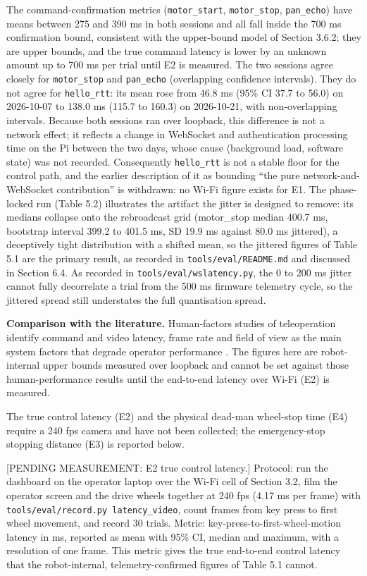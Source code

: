 The command-confirmation metrics (\texttt{motor\_start}, \texttt{motor\_stop}, \texttt{pan\_echo}) have means between 275 and 390 ms in both sessions and all fall inside the 700 ms confirmation bound, consistent with the upper-bound model of Section 3.6.2; they are upper bounds, and the true command latency is lower by an unknown amount up to 700 ms per trial until E2 is measured. The two sessions agree closely for \texttt{motor\_stop} and \texttt{pan\_echo} (overlapping confidence intervals). They do not agree for \texttt{hello\_rtt}: its mean rose from 46.8 ms (95\% CI 37.7 to 56.0) on 2026-10-07 to 138.0 ms (115.7 to 160.3) on 2026-10-21, with non-overlapping intervals. Because both sessions ran over loopback, this difference is not a network effect; it reflects a change in WebSocket and authentication processing time on the Pi between the two days, whose cause (background load, software state) was not recorded. Consequently \texttt{hello\_rtt} is not a stable floor for the control path, and the earlier description of it as bounding ``the pure network-and-WebSocket contribution'' is withdrawn: no Wi-Fi figure exists for E1. The phase-locked run (Table 5.2) illustrates the artifact the jitter is designed to remove: its medians collapse onto the rebroadcast grid (motor\_stop median 400.7 ms, bootstrap interval 399.2 to 401.5 ms, SD 19.9 ms against 80.0 ms jittered), a deceptively tight distribution with a shifted mean, so the jittered figures of Table 5.1 are the primary result, as recorded in \texttt{tools/eval/README.md} and discussed in Section 6.4. As recorded in \texttt{tools/eval/wslatency.py}, the 0 to 200 ms jitter cannot fully decorrelate a trial from the 500 ms firmware telemetry cycle, so the jittered spread still understates the full quantisation spread.

\textbf{Comparison with the literature.} Human-factors studies of teleoperation identify command and video latency, frame rate and field of view as the main system factors that degrade operator performance \cite{chen2007}. The figures here are robot-internal upper bounds measured over loopback and cannot be set against those human-performance results until the end-to-end latency over Wi-Fi (E2) is measured.

The true control latency (E2) and the physical dead-man wheel-stop time (E4) require a 240 fps camera and have not been collected; the emergency-stop stopping distance (E3) is reported below.

[PENDING MEASUREMENT: E2 true control latency.] Protocol: run the dashboard on the operator laptop over the Wi-Fi cell of Section 3.2, film the operator screen and the drive wheels together at 240 fps (4.17 ms per frame) with \texttt{tools/eval/record.py latency\_video}, count frames from key press to first wheel movement, and record 30 trials. Metric: key-press-to-first-wheel-motion latency in ms, reported as mean with 95\% CI, median and maximum, with a resolution of one frame. This metric gives the true end-to-end control latency that the robot-internal, telemetry-confirmed figures of Table 5.1 cannot.

